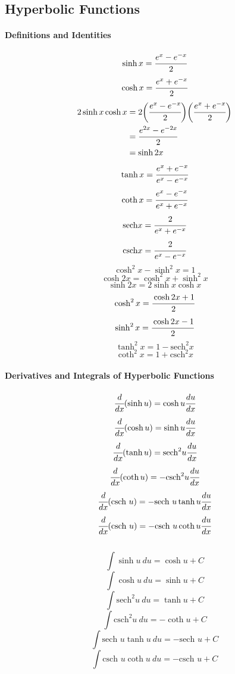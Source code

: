 \documentclass{article}
\begin{document}
        \subsection{Hyperbolic Functions}
            \paragraph{Definitions and Identities}
                \[\sinh x=\cfrac{e^x-e^{-x}}{2}\]
                \[\cosh x=\cfrac{e^x+e^{-x}}{2}\]
                \begin{equation}
                    \begin{aligned}
                        2\sinh x\cosh x&=2\bigg(\cfrac{e^x-e^{-x}}{2}\bigg)\bigg(\cfrac{e^x+e^{-x}}{2}\bigg)\\
                        &=\cfrac{e^{2x}-e^{-2x}}{2}\\
                        &=\sinh 2x
                    \end{aligned}                    
                \end{equation}
                \[\tanh x=\cfrac{e^x+e^{-x}}{e^x-e^{-x}}\]
                \[\coth x=\cfrac{e^x-e^{-x}}{e^x+e^{-x}}\]
                \[\text{sech} x=\cfrac{2}{e^x+e^{-x}}\]
                \[\text{csch} x=\cfrac{2}{e^x-e^{-x}}\]
                \[\cosh ^2 x-\sinh^2 x=1\]
                \[\cosh 2x=\cosh^2x+\sinh^2x\]
                \[\sinh 2x=2\sinh x\cosh x\]
                \[\cosh ^2x=\cfrac{\cosh 2x+1}{2}\]
                \[\sinh ^2x=\cfrac{\cosh 2x-1}{2}\]
                \[\tanh^2x=1-\text{sech}^2 x\]
                \[\coth^2x=1+\text{csch}^2 x\]
            \paragraph{Derivatives and Integrals of Hyperbolic Functions}
                \[\cfrac{d}{dx}(\sinh u)=\cosh u\cfrac{du}{dx}\]
                \[\cfrac{d}{dx}(\cosh u)=\sinh u\cfrac{du}{dx}\]
                \[\cfrac{d}{dx}(\tanh u)=\text{sech}^2 u\cfrac{du}{dx}\]
                \[\cfrac{d}{dx}(\coth u)=-\text{csch}^2 u\cfrac{du}{dx}\]
                \[\cfrac{d}{dx}(\text{csch } u)=-\text{sech }u \tanh u\cfrac{du}{dx}\]
                \[\cfrac{d}{dx}(\text{csch }u)=-\text{csch }u \coth u\cfrac{du}{dx}\]
                \text{}\\
                \[\int\sinh u\ du=\cosh u+C\]
                \[\int\cosh u\ du=\sinh u+C\]
                \[\int\text{sech}^2 u\ du=\tanh u+C\]
                \[\int\text{csch}^2 u\ du=-\coth u+C\]
                \[\int\text{sech } u\tanh u\ du=-\text{sech }u+C\]
                \[\int\text{csch } u\coth u\ du=-\text{csch }u+C\]
\end{document}
